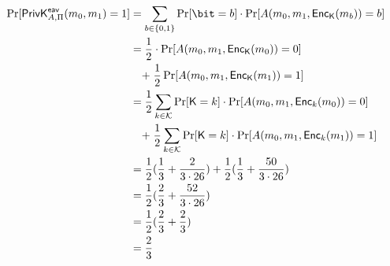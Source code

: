 \documentclass[12pt]{article}
\numberwithin{equation}{section}
\theoremstyle{plain}
\newcommand{\set}[1]{\{ #1 \}}
\DeclareMathOperator*{\prob}{Pr}
\newcommand{\keys}{\mathcal{K}}
\newcommand{\key}{\algo{K}}
\newcommand{\algo}[1]{\mathsf{#1}}
\newcommand{\priv}{\Pi}
\newcommand{\enc}{\algo{Enc}}
\newcommand{\expir}[3]{\algo{PrivK}^{#1}_{{#2},{#3}}}
\newcommand{\eav}{\algo{eav}}
\begin{document}
\begin{align*}
    \prob[\expir{\eav}{A}{\priv}(m_0, m_1) = 1]
        &= \sum_{b \in \set{ 0, 1 }}{ \prob[\bit = b] \cdot \prob[A(m_0, m_1, \enc_{\key}(m_b)) = b] }\\
        &= \frac{1}{2} \cdot \prob[A(m_0, m_1, \enc_{\key}(m_0)) = 0]\\
        &\mathrel{\phantom{=}} \mathrel{+} \frac{1}{2} \prob[A(m_0, m_1, \enc_{\key}(m_1)) = 1]\\
        &= \frac{1}{2} \sum_{k \in \keys}{ \prob[\key = k] \cdot \prob[A(m_0, m_1, \enc_{k}(m_0)) = 0] }\\
        &\mathrel{\phantom{=}} \mathrel{+} \frac{1}{2} \sum_{k \in \keys}{ \prob[\key = k] \cdot \prob[A(m_0, m_1, \enc_{k}(m_1)) = 1] }\\
        &= \frac{1}{2} ( \frac{1}{3} + \frac{2}{3 \cdot 26} ) + \frac{1}{2} ( \frac{1}{3} + \frac{50}{3 \cdot 26} )\\
        &= \frac{1}{2} (\frac{2}{3} + \frac{52}{3 \cdot 26} )\\
        &= \frac{1}{2} (\frac{2}{3} + \frac{2}{3})\\
        &= \frac{2}{3}
\end{align*}

\let\bit\undefined
\end{document}
